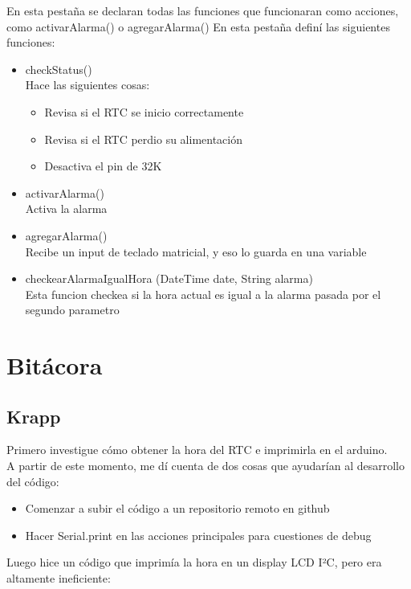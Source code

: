 \documentclass{article}
\begin{document}
	En esta pestaña se declaran todas las funciones que funcionaran como acciones,
	como activarAlarma() o agregarAlarma()
	En esta pestaña definí las siguientes funciones:
	\begin{itemize}
		\item checkStatus() \\ Hace las siguientes cosas:
			\begin{itemize}
				\item Revisa si el RTC se inicio correctamente
				\item Revisa si el RTC perdio su alimentación
				\item Desactiva el pin de 32K
			\end{itemize}
		\item activarAlarma() \\ Activa la alarma
		\item agregarAlarma() \\ 
			Recibe un input de teclado matricial, 
			y eso lo guarda en una variable
		\item checkearAlarmaIgualHora (DateTime date, String alarma) \\
			Esta funcion checkea si la hora actual es igual a la alarma 
			pasada por el segundo parametro
	\end{itemize}



\section{Bitácora}
	\subsection{Krapp}
	Primero investigue cómo obtener la hora del RTC e imprimirla en el arduino.\\
	A partir de este momento, me dí cuenta de dos cosas que ayudarían al desarrollo del código: 
	\begin{itemize}
		\item Comenzar a subir el código a un repositorio remoto en github
		\item Hacer Serial.print en las acciones principales para cuestiones de debug
	\end{itemize}
	  
	Luego hice un código que imprimía la hora en un display LCD I²C, pero era altamente ineficiente:
	  
\end{document}
